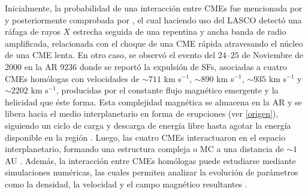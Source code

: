 Inicialmente, la probabilidad de una interacción entre CMEs fue mencionada por \textcite[][]{intriligator-1976} y posteriormente comprobada por \textcite[][]{gopalswamy-2001}, el cual haciendo uso del \ac{LASCO} detectó una ráfaga de rayos $X$ estrecha seguida de una repentina y ancha banda de radio amplificada, relacionada con el choque de una CME rápida atravesando el núcleo de una CME lenta. En otro caso, se observó el evento del $24$--$25$ de Noviembre de 2000 en la \ac{AR} 9236 donde se reportó la expulsión de \acp{SF}, asociadas a cuatro CMEs homólogas con velocidades de $\sim711$ km s$^{-1}$, $\sim890$ km s$^{-1}$, $\sim935$ km s$^{-1}$ y $\sim2202$ km s$^{-1}$, producidas por el constante flujo magnético emergente y la helicidad que éste forma. Esta complejidad magnética se almacena en la \ac{AR} y se libera hacia el medio interplanetario en forma de erupciones (ver \autoref{origen}), siguiendo un ciclo de carga y descarga de energía libre hasta agotar la energía disponible en la región \parencite[e.g.,][]{nitta-2001, zhang-2002, moon-2003a}. Luego, las cuatro CMEs interactuaron en el espacio interplanetario, formando una estructura compleja o \ac{MC} a una distancia de $\sim1$ AU \parencite[e.g.,][]{wang-2002}. Además, la interacción entre CMEs homólogas puede estudiarse mediante simulaciones numéricas, las cuales permiten analizar la evolución de parámetros como la densidad, la velocidad y el campo magnético resultantes \parencite[e.g.,][]{chatterjee-2013, soenen-2009, torok-2011, bemporad-2012}.

